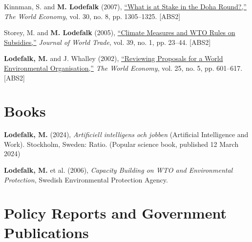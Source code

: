 \documentclass[11pt,a4paper]{article}
\newcommand{\name}[1]{\textbf{#1}}
\newcommand{\publication}[1]{\item #1}
\newcommand{\absrank}[1]{\textcolor{rankgray}{\scriptsize [ABS#1]}}
\begin{document}
\begin{enumerate}[label={[\arabic*]}]
\publication{Kinnman, S. and \name{M. Lodefalk} (2007), \href{https://doi.org/10.1111/j.1467-9701.2007.01045.x}{``What is at Stake in the Doha Round?,''} \textit{The World Economy}, vol. 30, no. 8, pp. 1305--1325. \absrank{2}}

\publication{Storey, M. and \name{M. Lodefalk} (2005), \href{https://doi.org/10.54648/trad2005005}{``Climate Measures and WTO Rules on Subsidies,''} \textit{Journal of World Trade}, vol. 39, no. 1, pp. 23--44. \absrank{2}}

\publication{\name{Lodefalk, M.} and J. Whalley (2002), \href{https://doi.org/10.1111/1467-9701.00452}{``Reviewing Proposals for a World Environmental Organisation,''} \textit{The World Economy}, vol. 25, no. 5, pp. 601--617. \absrank{2}}

\end{enumerate}

\section{Books}

\begin{enumerate}[label={[\arabic*]}]

\publication{\name{Lodefalk, M.} (2024), \textit{Artificiell intelligens och jobben} (Artificial Intelligence and Work). Stockholm, Sweden: Ratio. (Popular science book, published 12 March 2024)}

\publication{\name{Lodefalk, M.} et al. (2006), \textit{Capacity Building on WTO and Environmental Protection}, Swedish Environmental Protection Agency.}

\end{enumerate}

\section{Policy Reports and Government Publications}
\end{document}
